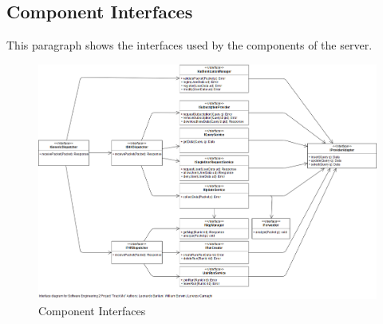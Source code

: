 \newpage
{\color{secblue}\subsection{Component Interfaces}}
This paragraph shows the interfaces used by the components of the server.
\begin{figure}[H]
    \includegraphics[width=\linewidth, keepaspectratio]{./Images/interface_diagram.png}
    \centering
    \caption{Component Interfaces}
    \label{fig:depview}
  \end{figure}